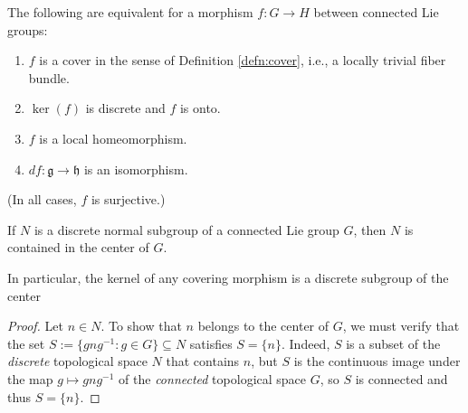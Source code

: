 \documentclass[reqno]{amsart} 
\begin{document}
\begin{exercise}\label{exercise:covering-morphisms}
  The following are equivalent for a morphism $f : G \rightarrow H$ between connected Lie groups:
  \begin{enumerate}
  \item $f$ is a cover in the sense of Definition \ref{defn:cover}, i.e., a locally trivial fiber bundle.
  \item $\ker(f)$ is discrete and $f$ is onto.
  \item $f$ is a local homeomorphism.
  \item $d f : \mathfrak{g} \rightarrow \mathfrak{h}$ is an isomorphism.
  \end{enumerate}
  (In all cases, $f$ is surjective.)
\end{exercise}

\begin{lemma}\label{lemma:discrete-norma-implies-central}
  If $N$ is a discrete normal subgroup of a connected Lie group $G$, then $N$ is contained in the center of $G$.

  In particular, the kernel of any covering morphism is a discrete subgroup of the center
\end{lemma}
\begin{proof}
  Let $n \in N$.  To show that $n$ belongs to the center of $G$, we must verify that the set $S := \{g n g^{-1} : g \in G \} \subseteq N$ satisfies $S = \{n\}$.  Indeed, $S$ is a subset of the \emph{discrete} topological space $N$ that contains $n$, but $S$ is the continuous image under the map $g \mapsto g n g^{-1}$ of the \emph{connected} topological space $G$, so $S$ is connected and thus $S = \{n\}$.
\end{proof}
\end{document}
